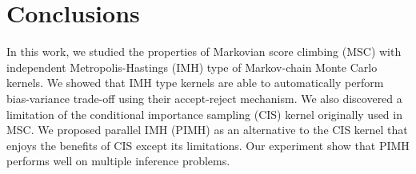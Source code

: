 
\section{Conclusions}
In this work, we studied the properties of Markovian score climbing (MSC) with independent Metropolis-Hastings (IMH) type of Markov-chain Monte Carlo kernels.
We showed that IMH type kernels are able to automatically perform bias-variance trade-off using their accept-reject mechanism.
We also discovered a limitation of the conditional importance sampling (CIS) kernel originally used in MSC.
We proposed parallel IMH (PIMH) as an alternative to the CIS kernel that enjoys the benefits of CIS except its limitations.
Our experiment show that PIMH performs well on multiple inference problems.

